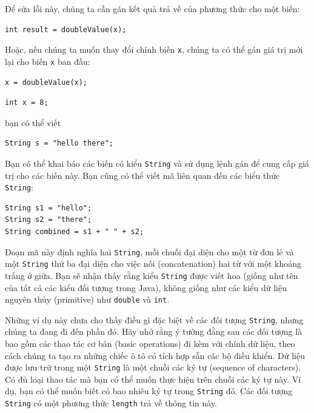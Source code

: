 Để sửa lỗi này, chúng ta cần gán kết quả trả về của phương thức cho một
biến:

\begin{verbatim}
int result = doubleValue(x);
\end{verbatim}

Hoặc, nếu chúng ta muốn thay đổi chính biến \texttt{x}, chúng ta có thể
gán giá trị mới lại cho biến \texttt{x} ban đầu:

\begin{verbatim}
x = doubleValue(x);
\end{verbatim}

\begin{verbatim}
int x = 8;
\end{verbatim}

bạn có thể viết

\begin{verbatim}
String s = "hello there";
\end{verbatim}

Bạn có thể khai báo các biến có kiểu \texttt{String} và sử dụng lệnh gán
để cung cấp giá trị cho các biến này. Bạn cũng có thể viết mã liên quan
đến các biểu thức \texttt{String}:

\begin{verbatim}
String s1 = "hello"; 
String s2 = "there"; 
String combined = s1 + " " + s2;
\end{verbatim}

Đoạn mã này định nghĩa hai \texttt{String}, mỗi chuỗi đại diện cho một
từ đơn lẻ và một \texttt{String} thứ ba đại diện cho việc nối
(concatenation) hai từ với một khoảng trắng ở giữa. Bạn sẽ nhận thấy
rằng kiểu \texttt{String} được viết hoa (giống như tên của tất cả các
kiểu đối tượng trong Java), không giống như các kiểu dữ liệu nguyên thủy
(primitive) như \texttt{double} và \texttt{int}.

Những ví dụ này chưa cho thấy điều gì đặc biệt về các đối tượng
\texttt{String}, nhưng chúng ta đang đi đến phần đó. Hãy nhớ rằng ý
tưởng đằng sau các đối tượng là bao gồm các thao tác cơ bản (basic
operations) đi kèm với chính dữ liệu, theo cách chúng ta tạo ra những
chiếc ô tô có tích hợp sẵn các bộ điều khiển. Dữ liệu được lưu trữ trong
một \texttt{String} là một chuỗi các ký tự (sequence of characters). Có
đủ loại thao tác mà bạn có thể muốn thực hiện trên chuỗi các ký tự này.
Ví dụ, bạn có thể muốn biết có bao nhiêu ký tự trong \texttt{String} đó.
Các đối tượng \texttt{String} có một phương thức \texttt{length} trả về
thông tin này.

